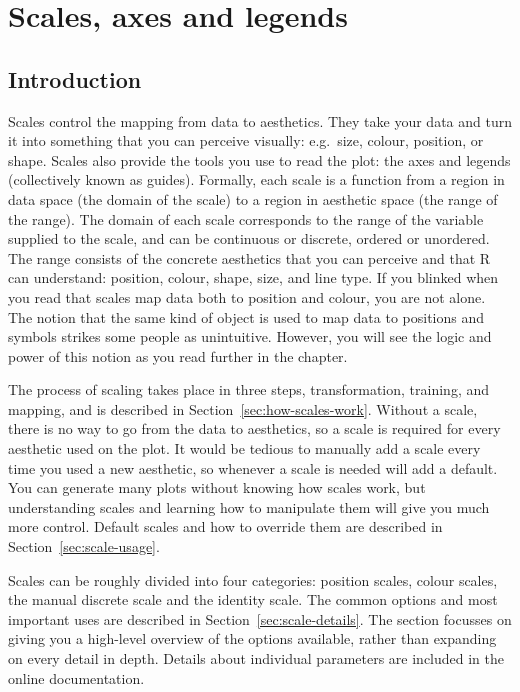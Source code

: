 
\chapter{Scales, axes and legends}
\label{cha:scales}

% 


\section{Introduction}

Scales control the mapping from data to aesthetics. They take your data and turn it into something that you can perceive visually: e.g.\ size, colour, position, or shape. Scales also provide the tools you use to read the plot: the axes and legends (collectively known as guides). Formally, each scale is a function from a region in data space (the domain of the scale) to a region in aesthetic space (the range of the range). The domain of each scale corresponds to the range of the variable supplied to the scale, and can be continuous or discrete, ordered or unordered. The range consists of the concrete aesthetics that you can perceive and that R can understand: position, colour, shape, size, and line type. If you blinked when you read that scales map data both to position and colour, you are not alone. The notion that the same kind of object is used to map data to positions and symbols strikes some people as unintuitive. However, you will see the logic and power of this notion as you read further in the chapter.

The process of scaling takes place in three steps, transformation, training, and mapping, and is described in Section~\ref{sec:how-scales-work}. Without a scale, there is no way to go from the data to aesthetics, so a scale is required for every aesthetic used on the plot. It would be tedious to manually add a scale every time you used a new aesthetic, so whenever a scale is needed \ggplot will add a default. You can generate many plots without knowing how scales work, but understanding scales and learning how to manipulate them will give you much more control. Default scales and how to override them are described in Section~\ref{sec:scale-usage}. 

Scales can be roughly divided into four categories: position scales, colour scales, the manual discrete scale and the identity scale. The common options and most important uses are described in Section~\ref{sec:scale-details}. The section focusses on giving you a high-level overview of the options available, rather than expanding on every detail in depth.  Details about individual parameters are included in the online documentation.

